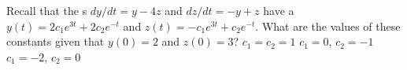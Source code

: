 \begin{activity}
Recall that the s \(dy/dt=y-4z\) and \(dz/dt=-y+z\) have a  \(y(t)=2c_1e^{3t}+2c_2e^{-t}\) and \(z(t)=-c_1e^{3t}+c_2e^{-t}\).
What are the values of these constants given that \(y(0)=2\) and \(z(0)=3\)?
{\(c_1=c_2=1\)}
{\(c_1=0\), \(c_2=-1\)}
{\(c_1=-2\), \(c_2=0\)}
\end{activity}




